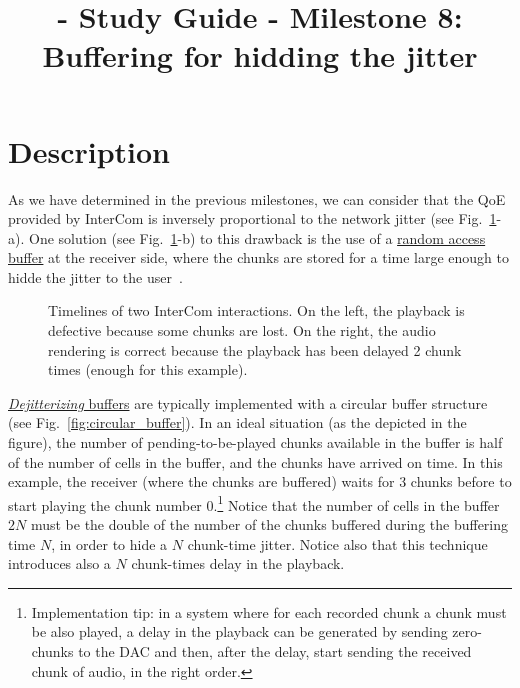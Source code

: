 
\title{\TM{} - Study Guide - Milestone 8: Buffering for hidding the jitter}

\maketitle

\section{Description}

As we have determined in the previous milestones, we can consider that
the QoE provided by InterCom is inversely proportional to the network
jitter (see Fig.~\ref{fig:timelines}-a). One solution (see
Fig.~\ref{fig:timelines}-b) to this drawback is the use of a
\href{https://en.wikipedia.org/wiki/Random_access}{random access}
\href{https://en.wikipedia.org/wiki/Data_buffer}{buffer} at the
receiver side, where the chunks are stored for a time large enough to
hidde the jitter to the user~\cite{Kurose-Ross}.

\begin{figure}
  \begin{center}
  \end{center}
  \caption{Timelines of two InterCom interactions. On the left, the
    playback is defective because some chunks are lost. On the right,
    the audio rendering is correct because the playback has been
    delayed 2 chunk times (enough for this example).}
  \label{fig:timelines}
\end{figure}

\href{https://en.wikipedia.org/wiki/Jitter#Jitter_buffers}{\emph{Dejitterizing}
  buffers} are typically implemented with a circular buffer structure
(see Fig.~\ref{fig:circular_buffer}). In an ideal situation (as
the depicted in the figure), the number of pending-to-be-played chunks
available in the buffer is half of the number of cells in the buffer,
and the chunks have arrived on time. In this example, the receiver
(where the chunks are buffered) waits for 3 chunks before to start
playing the chunk number 0.\footnote{Implementation tip: in a system
  where for each recorded chunk a chunk must be also played, a delay
  in the playback can be generated by sending zero-chunks to the DAC
  and then, after the delay, start sending the received chunk of
  audio, in the right order.} Notice that the number of cells in the
buffer $2N$ must be the double of the number of the chunks buffered
during the buffering time $N$, in order to hide a $N$ chunk-time
jitter. Notice also that this technique introduces also a $N$
chunk-times delay in the playback.

